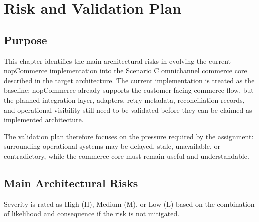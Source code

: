 \chapter{Risk and Validation Plan}

\section{Purpose}

This chapter identifies the main architectural risks in evolving the current nopCommerce
implementation into the Scenario C omnichannel commerce core described in the target
architecture. The current implementation is treated as the baseline: nopCommerce already
supports the customer-facing commerce flow, but the planned integration layer, adapters, retry
metadata, reconciliation records, and operational visibility still need to be validated before
they can be claimed as implemented architecture.

The validation plan therefore focuses on the pressure required by the assignment: surrounding
operational systems may be delayed, stale, unavailable, or contradictory, while the commerce core
must remain useful and understandable.

\section{Main Architectural Risks}

Severity is rated as High (H), Medium (M), or Low (L) based on the combination of likelihood
and consequence if the risk is not mitigated.

